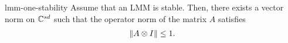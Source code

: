 \begin{Lemma}{lmm-one-stability}
  Assume that an LMM is stable. Then, there exists a vector norm on
  $\mathbb C^{s d}$ such that the operator norm of the matrix $A$
  satisfies
  \begin{gather}
    \label{eq:lmm-one-stability:1}
    \lVert A\otimes I\rVert \le 1.
  \end{gather}
\end{Lemma}

